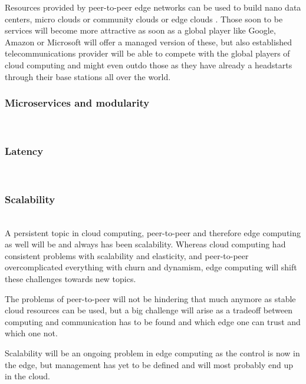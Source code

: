 Resources provided by peer-to-peer edge networks can be used to build nano data centers, micro clouds or community clouds or edge clouds . Those soon to be services will become more attractive as soon as a global player like Google, Amazon or Microsoft will offer a managed version of these, but also established telecommunications provider will be able to compete with the global players of cloud computing and might even outdo those as they have already a headstarts through their base stations all over the world.

\subsubsection{Microservices and modularity}\hspace*{\fill} \\

\subsubsection{Latency}\hspace*{\fill} \\

\subsubsection{Scalability}\hspace*{\fill} \\
A persistent topic in cloud computing, peer-to-peer and therefore edge computing as well will be and always has been scalability.
Whereas cloud computing had consistent problems with scalability and elasticity, and peer-to-peer overcomplicated everything with churn and dynamism, edge computing will shift these challenges towards new topics.

The problems of peer-to-peer will not be hindering that much anymore as stable cloud resources can be used, but a big challenge will arise as a tradeoff between computing and communication has to be found  and which edge one can trust and which one not.

Scalability will be an ongoing problem in edge computing as the control is now in the edge, but management has yet to be defined and will most probably end up in the cloud.

